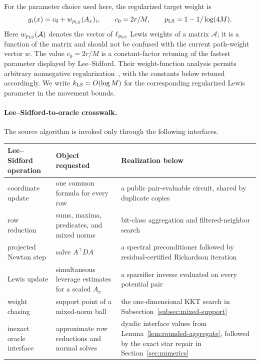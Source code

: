 \documentclass[11pt]{article}
\theoremstyle{definition}
\begin{document}
For the parameter choice used here, the regularized target weight is
\begin{equation}\label{eq:regularized-lewis-target}
 g_i(x)=c_0+w_{p_{\rm LS}}(A_x)_i,
 \qquad c_0=2r/M,\qquad
 p_{\rm LS}=1-1/\log(4M).
\end{equation}
Here $w_{p_{\rm LS}}(\mathcal A)$ denotes the vector of
$\ell_{p_{\rm LS}}$ Lewis weights of a matrix $\mathcal A$; it is a function
of the matrix and should not be confused with the current path-weight vector
$w$.  The value $c_0=2r/M$ is a constant-factor retuning of the fastest
parameter displayed by Lee--Sidford.  Their weight-function analysis permits
arbitrary nonnegative regularization~\cite[Theorem 29]{LeeSidford2020}, with
the constants below retuned accordingly.  We write
$k_{\rm LS}=O(\log M)$ for the corresponding regularized Lewis parameter in
the movement bounds.

\paragraph{Lee--Sidford-to-oracle crosswalk.}
The source algorithm is invoked only through the following interfaces.
\begin{center}
\small
\begin{tabular}{@{}p{.29\linewidth}p{.29\linewidth}p{.34\linewidth}@{}}
\toprule
Lee--Sidford operation & Object requested & Realization below\\
\midrule
coordinate update & one common formula for every row
  & a public pair-evaluable circuit, shared by duplicate copies\\
row reduction & sums, maxima, predicates, and mixed norms
  & bit-class aggregation and filtered-neighbor search\\
projected Newton step & solve $A^\top DA$
  & a spectral preconditioner followed by residual-certified Richardson
    iteration\\
Lewis update & simultaneous leverage estimates for a scaled $A_x$
  & a sparsifier inverse evaluated on every potential pair\\
weight chasing & support point of a mixed-norm ball
  & the one-dimensional KKT search in
    Subsection~\ref{subsec:mixed-support}\\
inexact oracle interface & approximate row reductions and normal solves
  & dyadic interface values from Lemma~\ref{lem:rounded-aggregate}, followed
    by the exact star repair in Section~\ref{sec:numerics}\\
\bottomrule
\end{tabular}
\end{center}
\end{document}
